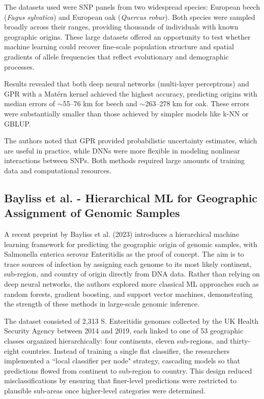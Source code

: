 The datasets used were SNP panels from two widespread species: European beech (\textit{Fagus sylvatica}) and European oak (\textit{Quercus robur}). Both species were sampled broadly across their ranges, providing thousands of individuals with known geographic origins. These large datasets offered an opportunity to test whether machine learning could recover fine-scale population structure and spatial gradients of allele frequencies that reflect evolutionary and demographic processes.

Results revealed that both deep neural networks (multi-layer perceptrons) and GPR with a Matérn kernel achieved the highest accuracy, predicting origins with median errors of $\sim$55–76 km for beech and $\sim$263–278 km for oak. These errors were substantially smaller than those achieved by simpler models like k-NN or GBLUP.

The authors noted that GPR provided probabilistic uncertainty estimates, which are useful in practice, while DNNs were more flexible in modeling nonlinear interactions between SNPs. Both methods required large amounts of training data and computational resources.

\subsection{Bayliss et al. - Hierarchical ML for Geographic Assignment of Genomic Samples}

A recent preprint by Bayliss et al. (2023) \cite{bayliss2022hierarchical} introduces a hierarchical machine learning framework for predicting the geographic origin of genomic samples, with Salmonella enterica serovar Enteritidis as the proof of concept. The aim is to trace sources of infection by assigning each genome to its most likely continent, sub-region, and country of origin directly from DNA data. Rather than relying on deep neural networks, the authors explored more classical ML approaches such as random forests, gradient boosting, and support vector machines, demonstrating the strength of these methods in large-scale genomic inference.

The dataset consisted of 2,313 S. Enteritidis genomes collected by the UK Health Security Agency between 2014 and 2019, each linked to one of 53 geographic classes organized hierarchically: four continents, eleven sub-regions, and thirty-eight countries. Instead of training a single flat classifier, the researchers implemented a ``local classifier per node" strategy, cascading models so that predictions flowed from continent to sub-region to country. This design reduced misclassifications by ensuring that finer-level predictions were restricted to plausible sub-areas once higher-level categories were determined.

